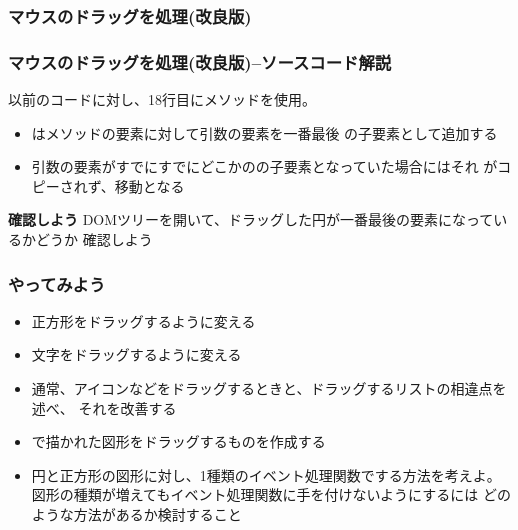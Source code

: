 \begin{frame}[containsverbatim]
 \frametitle{マウスのドラッグを処理(改良版)}
\end{frame}
\begin{frame}[containsverbatim]
 \frametitle{マウスのドラッグを処理(改良版)--ソースコード解説}
以前のコードに対し、18行目にメソッドを使用。
 \begin{itemize}
  \item {}はメソッドの要素に対して引数の要素を一番最後
        の子要素として追加する
  \item 引数の要素がすでにすでにどこかのの子要素となっていた場合にはそれ
        がコピーされず、移動となる
 \end{itemize}
 {\bfseries 確認しよう}
 DOMツリーを開いて、ドラッグした円が一番最後の要素になっているかどうか
 確認しよう
\end{frame}
\begin{frame}[containsverbatim]
 \frametitle{やってみよう}
\begin{itemize}
 \item 正方形をドラッグするように変える
 \item 文字をドラッグするように変える
 \item 通常、アイコンなどをドラッグするときと、ドラッグするリストの相違点を述べ、
			 それを改善する
 \item {}で描かれた図形をドラッグするものを作成する
 \item 円と正方形の図形に対し、1種類のイベント処理関数でする方法を考えよ。
			 図形の種類が増えてもイベント処理関数に手を付けないようにするには
			 どのような方法があるか検討すること
\end{itemize}
\end{frame}

\begin{frame}[containsverbatim]
 \frametitle{}
\end{frame}
